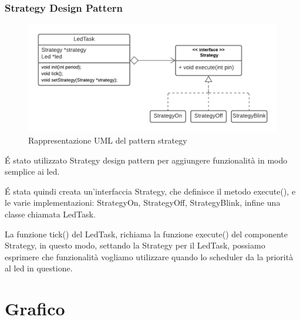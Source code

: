 \documentclass[a4paper,12pt]{report}
\begin{document}
\subsection{Strategy Design Pattern}
\begin{figure}[H]
    \centering
    \includegraphics[width=13cm]{Strategy.png}
    \caption{Rappresentazione UML del pattern strategy}
\end{figure}
\par
\'E stato utilizzato Strategy design pattern per aggiungere funzionalità in modo semplice ai led.
\par
\'E stata quindi creata un'interfaccia Strategy, che definisce il metodo execute(), e le varie implementazioni: StrategyOn, StrategyOff, StrategyBlink, infine una classe chiamata LedTask.
\par 
La funzione tick() del LedTask, richiama la funzione execute() del componente Strategy, in questo modo, settando la Strategy per il LedTask, possiamo esprimere che funzionalità vogliamo utilizzare quando lo scheduler da la priorità al led in questione.

\chapter{Grafico}
\end{document}
